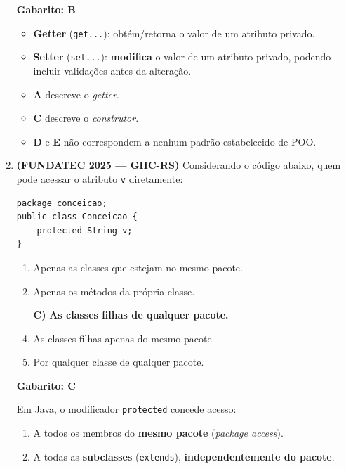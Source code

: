 \documentclass[12pt,a4paper]{article}
\begin{document}
\begin{enumerate}
\begin{tcolorbox}[respostabox]
\textbf{Gabarito: B}

\begin{itemize}
    \item \textbf{Getter} (\texttt{get...}): obtém/retorna o valor de um atributo privado.
    \item \textbf{Setter} (\texttt{set...}): \textbf{modifica} o valor de um atributo privado, podendo incluir validações antes da alteração.
    \item \textbf{A} descreve o \textit{getter}.
    \item \textbf{C} descreve o \textit{construtor}.
    \item \textbf{D} e \textbf{E} não correspondem a nenhum padrão estabelecido de POO.
\end{itemize}
\end{tcolorbox}

\vspace{0.4cm}

\item \textbf{(FUNDATEC 2025 — GHC-RS)} Considerando o código abaixo, quem pode acessar o atributo \texttt{v} diretamente:

\begin{lstlisting}
package conceicao;
public class Conceicao {
    protected String v;
}
\end{lstlisting}

    \begin{enumerate}[label=\Alph*)]
        \item Apenas as classes que estejam no mesmo pacote.
        \item Apenas os métodos da própria classe.
        \item[\textbf{C)}] \textbf{As classes filhas de qualquer pacote.} \checkmark
        \item As classes filhas apenas do mesmo pacote.
        \item Por qualquer classe de qualquer pacote.
    \end{enumerate}

\begin{tcolorbox}[respostabox]
\textbf{Gabarito: C}

Em Java, o modificador \texttt{protected} concede acesso:
\begin{enumerate}
    \item A todos os membros do \textbf{mesmo pacote} (\textit{package access}).
    \item A todas as \textbf{subclasses} (\texttt{extends}), \textbf{independentemente do pacote}.
\end{enumerate}


\end{tcolorbox}
\end{enumerate}
\end{document}
